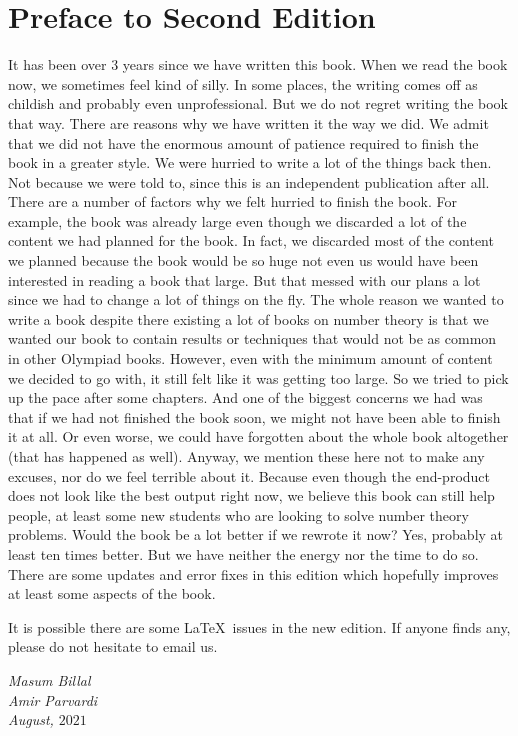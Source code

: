 \documentclass[leqno,12pt]{book}
\begin{document}
\section*{Preface to Second Edition}
It has been over $3$ years since we have written this book. When we read the book now, we sometimes feel kind of silly. In some places, the writing comes off as childish and probably even unprofessional. But we do not regret writing the book that way. There are reasons why we have written it the way we did. We admit that we did not have the enormous amount of patience required to finish the book in a greater style. We were hurried to write a lot of the things back then. Not because we were told to, since this is an independent publication after all. There are a number of factors why we felt hurried to finish the book. For example, the book was already large even though we discarded a lot of the content we had planned for the book. In fact, we discarded most of the content we planned because the book would be so huge not even us would have been interested in reading a book that large. But that messed with our plans a lot since we had to change a lot of things on the fly. The whole reason we wanted to write a book despite there existing a lot of books on number theory is that we wanted our book to contain results or techniques that would not be as common in other Olympiad books. However, even with the minimum amount of content we decided to go with, it still felt like it was getting too large. So we tried to pick up the pace after some chapters. And one of the biggest concerns we had was that if we had not finished the book soon, we might not have been able to finish it at all. Or even worse, we could have forgotten about the whole book altogether (that has happened as well). Anyway, we mention these here not to make any excuses, nor do we feel terrible about it. Because even though the end-product does not look like the best output right now, we believe this book can still help people, at least some new students who are looking to solve number theory problems. Would the book be a lot better if we rewrote it now? Yes, probably at least ten times better. But we have neither the energy nor the time to do so. There are some updates and error fixes in this edition which hopefully improves at least some aspects of the book.

It is possible there are some \LaTeX\ issues in the new edition. If anyone finds any, please do not hesitate to email us.

\begin{flushright}
	\it Masum Billal\\
	Amir Parvardi\\
	August, $2021$
\end{flushright}
\end{document}
